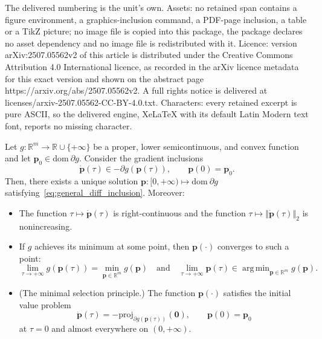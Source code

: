 \documentclass[10pt,a4paper]{amsart}
\DeclareMathOperator*{\argmin}{arg\,min}
\def\R {\mathbb{R}}
\def\Rm {\R^m}
\def\bp {\boldsymbol{p}}
\def\dom {\mathrm{dom~}}    %
\def\proj {\mathrm{proj}}
\newcommand{\normtwo}[1]{\left\Vert{#1} \right\Vert_{2}}
\begin{document}
The delivered numbering is the unit's own. Assets: no retained span contains a figure environment, a graphics-inclusion command, a PDF-page inclusion, a table or a TikZ picture; no image file is copied into this package, the package declares no asset dependency and no image file is redistributed with it. Licence: version arXiv:2507.05562v2 of this article is distributed under the Creative Commons Attribution 4.0 International licence, as recorded in the arXiv licence metadata for this exact version and shown on the abstract page https://arxiv.org/abs/2507.05562v2. A full rights notice is delivered at licenses/arxiv-2507.05562-CC-BY-4.0.txt. Characters: every retained excerpt is pure ASCII, so the delivered engine, XeLaTeX with its default Latin Modern text font, reports no missing character.
\begin{thm}\label{thm:eu_diff_inclusions} Let $g\colon \Rm \to \R\cup\{+\infty\}$ be a proper, lower semicontinuous, and convex function and let $\bp_{0} \in \dom \partial g$. Consider the gradient inclusions
\begin{equation}\label{eq:general_diff_inclusion}
    \dot{\bp}(\tau) \in - \partial g(\bp(\tau)), \qquad \bp(0) = \bp_{0}.
\end{equation}
Then, there exists a unique solution $\bp \colon [0,+\infty) \mapsto \dom \partial g$ satisfying~\eqref{eq:general_diff_inclusion}. Moreover:
\begin{itemize}
    \item[(i)] The function $\tau \mapsto \dot{\bp}(\tau)$ is right-continuous and the function $\tau \mapsto \normtwo{\dot{\bp}(\tau)}$ is nonincreasing.
    
    \item[(ii)] If $g$ achieves its minimum at some point, then $\bp(\cdot)$ converges to such a point:
    \[
    \lim_{\tau \to +\infty} g(\bp(\tau)) = \min_{\bp \in \Rm} g(\bp) \quad \text{and} \quad \lim_{\tau \to +\infty} \bp(\tau) \in \argmin_{\bp \in \Rm} g(\bp).
    \]
    \item[(iii)] (The minimal selection principle.) The function $\bp(\cdot)$ satisfies the initial value problem
    \begin{equation}\label{eq:general_slow_ode}
            \dot{\bp}(\tau) =-\proj_{\partial g(\bp(\tau))}(\boldsymbol{0}), \qquad \bp(0) = \bp_{0}
    \end{equation}
    at $\tau = 0$ and almost everywhere on $(0,+\infty)$. 
\end{itemize}
\end{thm}
\end{document}
